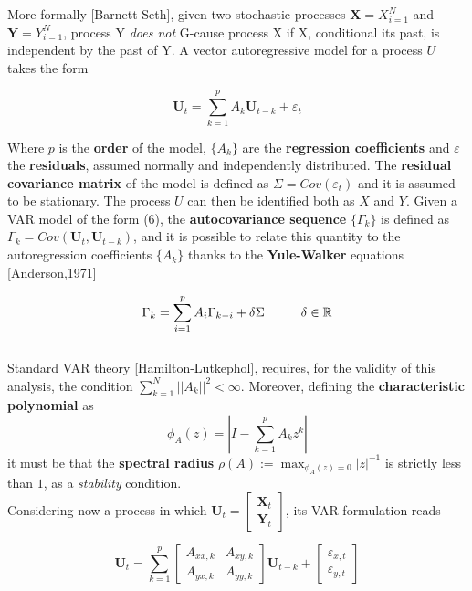\documentclass[a4paper]{article}
\begin{document}
More formally [Barnett-Seth], given two stochastic processes $ \textbf{X} = {X}_{i=1}^N $ and $ \textbf{Y} = {Y}_{i=1}^N $, process Y \textit{does not} G-cause process X if X, conditional its past, is independent by the past of Y. A vector autoregressive model for a process $U$ takes the form

\begin{equation}
\textbf{U}_t = \sum_{k=1}^{p} A_k \textbf{U}_{t-k} + \varepsilon_t 
\end{equation}



Where $p$ is the \textbf{order} of the model, $\{ A_k\}$ are the \textbf{regression coefficients} and $\varepsilon$ the \textbf{residuals}, assumed normally and independently distributed. The \textbf{ residual covariance matrix} of the model is defined as $ \Sigma = Cov(\varepsilon_t) $ and it is assumed to be stationary. The process $U$ can then be identified both as $X$ and $Y$. Given a VAR model of the form (6), the \textbf{autocovariance sequence} $ \{\Gamma_k\} $ is defined as $ \Gamma_k = Cov(\textbf{U}_t,\textbf{U}_{t-k})$, and it is possible to relate this quantity to the autoregression coefficients $\{ A_k\}$ thanks to the \textbf{Yule-Walker} equations [Anderson,1971]

\begin{equation}
	\Gamma_k = \sum_{i=1}^{p} A_i \Gamma_{k-i} + \delta \Sigma \hspace{1 cm }  \delta \in \mathbb{R}
\end{equation}\\

Standard VAR theory [Hamilton-Lutkephol], requires, for the validity of this analysis, the condition $ \sum_{k=1}^{N}||A_k||^2 < \infty $. Moreover, defining the \textbf{characteristic polynomial} as 
$$ \phi_A(z)= \left| I - \sum_{k=1}^{p} A_k z^k \right| $$
it must be that the \textbf{spectral radius} $\rho(A) := \max_{\phi_A(z)=0}|z|^{-1}$ is strictly less than $1$, as a \textit{stability} condition.
\\

Considering now a process in which $ \textbf{U}_t = \begin{bmatrix} \textbf{X}_t  \\  \textbf{Y}_t \end{bmatrix} $, its VAR formulation reads

\begin{equation}
\textbf{U}_t = \sum_{k=1}^{p} \begin{bmatrix} A_{xx,k}  &  A_{xy,k} \\  A_{yx,k}  & A_{yy,k} \end{bmatrix} \textbf{U}_{t-k} + \begin{bmatrix} \varepsilon_{x,t}  \\  \varepsilon_{y,t} \end{bmatrix}
\end{equation}
\end{document}
